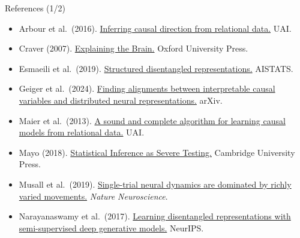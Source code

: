 \documentclass[aspectratio=169,11pt]{beamer}
\begin{document}
\begin{frame}{References (1/2)}
\vspace{-0.3em}
{\scriptsize
\begin{itemize}\setlength\itemsep{0pt}
  \item Arbour et al.\ (2016). \href{https://www.auai.org/uai2016/proceedings/papers/217.pdf}{Inferring causal direction from relational data.} UAI.
  \item Craver (2007). \href{https://doi.org/10.1093/acprof:oso/9780199299317.001.0001}{Explaining the Brain.} Oxford University Press.
  \item Esmaeili et al.\ (2019). \href{https://proceedings.mlr.press/v89/esmaeili19a}{Structured disentangled representations.} AISTATS.
  \item Geiger et al.\ (2024). \href{https://arxiv.org/abs/2303.02536}{Finding alignments between interpretable causal variables and distributed neural representations.} arXiv.
  \item Maier et al.\ (2013). \href{https://arxiv.org/abs/1309.6843}{A sound and complete algorithm for learning causal models from relational data.} UAI.
  \item Mayo (2018). \href{https://doi.org/10.1017/9781107286184}{Statistical Inference as Severe Testing.} Cambridge University Press.
  \item Musall et al.\ (2019). \href{https://doi.org/10.1038/s41593-019-0502-4}{Single-trial neural dynamics are dominated by richly varied movements.} \textit{Nature Neuroscience}.
  \item Narayanaswamy et al.\ (2017). \href{https://arxiv.org/abs/1706.00400}{Learning disentangled representations with semi-supervised deep generative models.} NeurIPS.
\end{itemize}
}
\end{frame}
\end{document}
